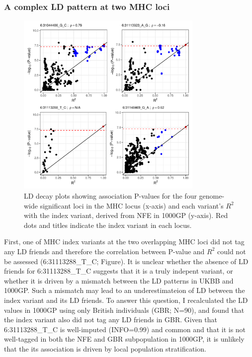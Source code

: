   \subsubsection{A complex LD pattern at two MHC loci}
  \begin{figure}[H] 
    \centering    
    \includegraphics[width=0.8\textwidth]{ukbb_ld_decay_mhc}
    \caption[Figure]{LD decay plots showing association P-values for the four genome-wide significant loci in the MHC locus (x-axis) and each variant's $R^{2}$ with the index variant, derived from NFE in 1000GP (y-axis). Red dots and titles indicate the index variant in each locus. }
    \label{fig:ukbb_ld_decay_mhc}
    \end{figure}
  First, one of MHC index variants at the two overlapping MHC loci did not tag any LD friends and therefore the correlation between P-value and $R^{2}$ could not be assessed (6:31113288\_T\_C; Figure). It is unclear whether the absence of LD friends for 6:31113288\_T\_C suggests that it is a truly indepent variant, or whether it is driven by a mismatch between the LD patterns in UKBB and 1000GP. Such a mismatch may lead to an underestimateion of LD between the index variant and its LD friends. To answer this question, I recalculated the LD values in 1000GP using only British individuals (GBR; N=90), and found that the index variant also did not tag any LD friends in GBR. Given that 6:31113288\_T\_C is well-imputed (INFO=0.99) and common and that it is not well-tagged in both the NFE and GBR subpopulation in 1000GP, it is unlikely that the its association is driven by local population stratification.

